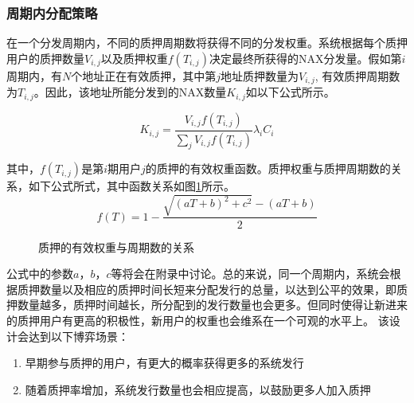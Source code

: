 \subsubsection{周期内分配策略}
在一个分发周期内，不同的质押周期数将获得不同的分发权重。系统根据每个质押用户的质押数量$V_{i,j}$以及质押权重\(f(T_{i,j})\)决定最终所获得的NAX分发量。假如第$i$周期内，有$N$个地址正在有效质押，其中第$j$地址质押数量为$V_{i,j}$, 有效质押周期数为$T_{i,j}$。因此，该地址所能分发到的NAX数量$K_{i,j}$如以下公式所示。

\begin{equation}
  K_{i,j} = \frac{V_{i,j} f(T_{i,j})}{\sum_j V_{i,j} f(T_{i,j})} \lambda_i C_i
\end{equation}

其中，\(f(T_{i,j})\)是第\(i\)期用户\(j\)的质押的有效权重函数。质押权重与质押周期数的关系，如下公式所式，其中函数关系如图\ref{weight}所示。
\begin{equation}
  f(T) = 1 - \frac{\sqrt{(aT+b)^2+c^2}-(aT+b)}{2}
\end{equation}

\begin{figure}[h]
\centering
\caption{质押的有效权重与周期数的关系}\label{weight}
\end{figure}

公式中的参数$a$，$b$，$c$等将会在附录中讨论。总的来说，同一个周期内，系统会根据质押数量以及相应的质押时间长短来分配发行的总量，以达到公平的效果，即质押数量越多，质押时间越长，所分配到的发行数量也会更多。但同时使得让新进来的质押用户有更高的积极性，新用户的权重也会维系在一个可观的水平上。 该设计会达到以下博弈场景：

\begin{enumerate}[\hspace{1cm}(a)]
  \item 早期参与质押的用户，有更大的概率获得更多的系统发行
  \item 随着质押率增加，系统发行数量也会相应提高，以鼓励更多人加入质押
\end{enumerate}

